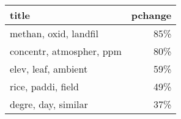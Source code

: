 \begin{tabular}{p{1.2cm}r}
\toprule
                    title &  pchange \\
\midrule
    methan, oxid, landfil &      85\% \\
 concentr, atmospher, ppm &      80\% \\
      elev, leaf, ambient &      59\% \\
       rice, paddi, field &      49\% \\
      degre, day, similar &      37\% \\
\bottomrule
\end{tabular}
